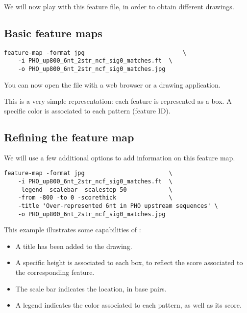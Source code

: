 We will now play with this feature file, in order to obtain different
drawings.

\subsection{Basic feature maps}

\begin{verbatim}
feature-map -format jpg                            \
    -i PHO_up800_6nt_2str_ncf_sig0_matches.ft  \
    -o PHO_up800_6nt_2str_ncf_sig0_matches.jpg
\end{verbatim}

You can now open the file
 with a web
browser or a drawing application.

This is a very simple representation: each feature is represented as a
box. A specific color is associated to each pattern (feature ID). 

\subsection{Refining the feature map}

We will use a few additional options to add information on this
feature map. 

\begin{verbatim}
feature-map -format jpg                        \
    -i PHO_up800_6nt_2str_ncf_sig0_matches.ft  \
    -legend -scalebar -scalestep 50            \
    -from -800 -to 0 -scorethick               \
    -title 'Over-represented 6nt in PHO upstream sequences' \
    -o PHO_up800_6nt_2str_ncf_sig0_matches.jpg
\end{verbatim}

This example illustrates some capabilities of :

\begin{itemize}
\item A title has been added to the drawing. 

\item A specific height is associated to each box, to reflect
the score associated to the corresponding feature.

\item The scale bar indicates the location, in base pairs. 

\item A legend indicates the color associated to each pattern, as well 
as its score. 

\end{itemize}

